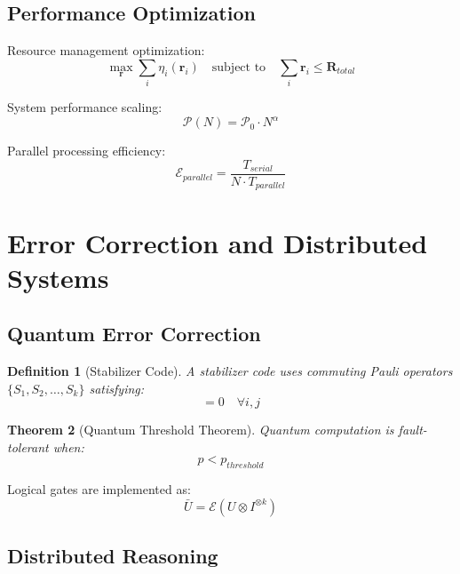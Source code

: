 \documentclass[12pt]{article}
\newtheorem{theorem}{Theorem}[section]
\newtheorem{definition}[theorem]{Definition}
\begin{document}
\subsection{Performance Optimization}

Resource management optimization:
\begin{equation}
\max_{\mathbf{r}} \sum_i \eta_i(\mathbf{r}_i) \quad \text{subject to} \quad \sum_i \mathbf{r}_i \leq \mathbf{R}_{total}
\end{equation}

System performance scaling:
\begin{equation}
\mathcal{P}(N) = \mathcal{P}_0 \cdot N^{\alpha}
\end{equation}

Parallel processing efficiency:
\begin{equation}
\mathcal{E}_{parallel} = \frac{T_{serial}}{N \cdot T_{parallel}}
\end{equation}

\section{Error Correction and Distributed Systems}

\subsection{Quantum Error Correction}

\begin{definition}[Stabilizer Code]
A stabilizer code uses commuting Pauli operators $\{S_1, S_2, \ldots, S_k\}$ satisfying:
\begin{equation}
[S_i, S_j] = 0 \quad \forall i, j
\end{equation}
\end{definition}

\begin{theorem}[Quantum Threshold Theorem]
Quantum computation is fault-tolerant when:
\begin{equation}
p < p_{threshold}
\end{equation}
\end{theorem}

Logical gates are implemented as:
\begin{equation}
\bar{U} = \mathcal{E}(U \otimes I^{\otimes k})
\end{equation}

\subsection{Distributed Reasoning}
\end{document}
